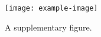 \begin{figure}[h!]
    \texttt{[image: example-image]}
    \caption{A supplementary figure.}
    \label{fig:supplemental}
\end{figure}
